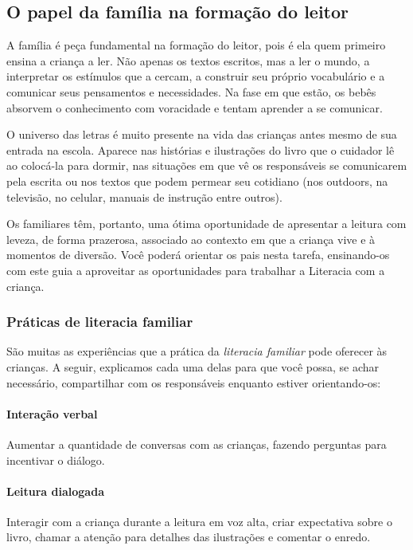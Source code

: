 \documentclass[11pt]{extarticle}
\begin{document}
{{\subsection{O papel da família na formação do leitor}
A família é peça fundamental na formação do leitor, pois é ela quem primeiro 
ensina a criança a ler. Não apenas os textos escritos, mas a ler o mundo, a 
interpretar os estímulos que a cercam, a construir seu próprio vocabulário e a 
comunicar seus pensamentos e necessidades. Na fase em que estão, os bebês 
absorvem o conhecimento com voracidade e tentam aprender a se comunicar. 

O universo das letras é muito presente na vida das crianças antes mesmo de sua 
entrada na escola. Aparece nas histórias e ilustrações do livro que o cuidador 
lê ao colocá-la para dormir, nas situações em que vê os responsáveis se comunicarem 
pela escrita ou nos textos que podem permear seu cotidiano (nos outdoors, na 
televisão, no celular, manuais de instrução entre outros). 

Os familiares têm, 
portanto, uma ótima oportunidade de apresentar a leitura com leveza, de forma 
prazerosa, associado ao contexto em que a criança vive e à momentos de diversão. 
Você poderá orientar os pais nesta tarefa, ensinando-os com este guia a aproveitar 
as oportunidades para trabalhar a Literacia com a criança.


\subsubsection{Práticas de literacia familiar} 

São muitas as experiências que a prática da \textit{literacia familiar} 
pode oferecer às crianças. A seguir, explicamos cada uma delas para que você possa, 
se achar necessário, compartilhar com os responsáveis enquanto estiver orientando-os: 

\paragraph{Interação verbal} Aumentar a quantidade de conversas com as 
crianças, fazendo perguntas para incentivar o diálogo.

\paragraph{Leitura dialogada} Interagir com a criança durante a leitura 
em voz alta, criar expectativa sobre o livro, chamar a atenção para detalhes 
das ilustrações e comentar o enredo.

}}
\end{document}
